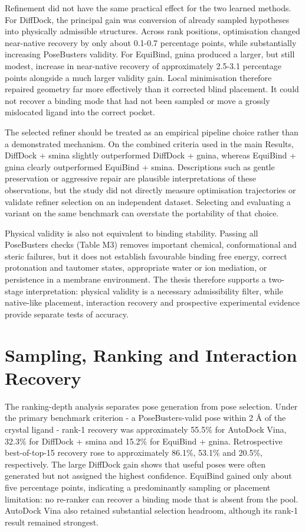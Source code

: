 Refinement did not have the same practical effect for the two learned methods. For DiffDock, the principal gain was conversion of already sampled hypotheses into physically admissible structures. Across rank positions, optimisation changed near-native recovery by only about 0.1-0.7 percentage points, while substantially increasing PoseBusters validity. For EquiBind, gnina produced a larger, but still modest, increase in near-native recovery of approximately 2.5-3.1 percentage points alongside a much larger validity gain. Local minimisation therefore repaired geometry far more effectively than it corrected blind placement. It could not recover a binding mode that had not been sampled or move a grossly mislocated ligand into the correct pocket.

The selected refiner should be treated as an empirical pipeline choice rather than a demonstrated mechanism. On the combined criteria used in the main Results, DiffDock + smina slightly outperformed DiffDock + gnina, whereas EquiBind + gnina clearly outperformed EquiBind + smina. Descriptions such as gentle preservation or aggressive repair are plausible interpretations of these observations, but the study did not directly measure optimisation trajectories or validate refiner selection on an independent dataset. Selecting and evaluating a variant on the same benchmark can overstate the portability of that choice.

Physical validity is also not equivalent to binding stability. Passing all PoseBusters checks (Table M3) removes important chemical, conformational and steric failures, but it does not establish favourable binding free energy, correct protonation and tautomer states, appropriate water or ion mediation, or persistence in a membrane environment. The thesis therefore supports a two-stage interpretation: physical validity is a necessary admissibility filter, while native-like placement, interaction recovery and prospective experimental evidence provide separate tests of accuracy.

\hypertarget{sampling-ranking-and-interaction-recovery}{%
\section{Sampling, Ranking and Interaction Recovery}\label{sampling-ranking-and-interaction-recovery}}

The ranking-depth analysis separates pose generation from pose selection. Under the primary benchmark criterion - a PoseBusters-valid pose within 2 Å of the crystal ligand - rank-1 recovery was approximately 55.5\% for AutoDock Vina, 32.3\% for DiffDock + smina and 15.2\% for EquiBind + gnina. Retrospective best-of-top-15 recovery rose to approximately 86.1\%, 53.1\% and 20.5\%, respectively. The large DiffDock gain shows that useful poses were often generated but not assigned the highest confidence. EquiBind gained only about five percentage points, indicating a predominantly sampling or placement limitation: no re-ranker can recover a binding mode that is absent from the pool. AutoDock Vina also retained substantial selection headroom, although its rank-1 result remained strongest.

